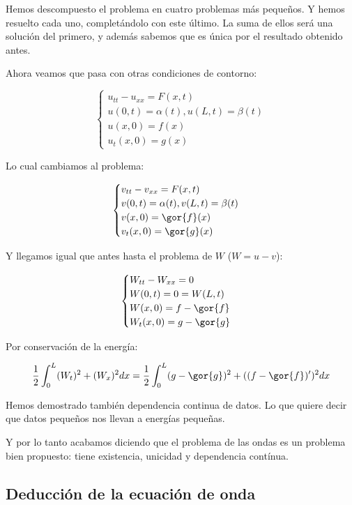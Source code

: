 			Hemos descompuesto el problema en cuatro problemas más pequeños. Y hemos resuelto cada uno, completándolo con este último. La suma de ellos será una solución del primero, y además sabemos que es única por el resultado obtenido antes.

			Ahora veamos que pasa con otras condiciones de contorno:

			\[ \begin{cases}
		 		u_{tt} - u_{xx} = F(x,t)\\
		 		u(0,t) = \alpha(t), u(L,t) = \beta(t) \\
		 		u(x,0) = f(x) \\
		 		u_t(x,0) = g(x)
		 	\end{cases}\]

		 	Lo cual cambiamos al problema:

		 	\[ \begin{cases}
		 		v_{tt} - v_{xx} = F(x,t)\\
		 		v(0,t) = \alpha(t), v(L,t) = \beta(t) \\
		 		v(x,0) = \gor{f}(x) \\
		 		v_t(x,0) = \gor{g}(x)
		 	\end{cases}\]

		 	Y llegamos igual que antes hasta el problema de $W$ ($W = u-v$):

		 	\[ \begin{cases}
		 		W_{tt} - W_{xx} = 0\\
		 		W(0,t) = 0 = W(L,t) \\
		 		W(x,0) = f - \gor{f} \\
		 		W_t(x,0) = g-  \gor{g}
		 	\end{cases}\]

		 	Por conservación de la energía:

		 	\[ \frac{1}{2} \int_0^L (W_t)^2 + (W_x)^2 dx = \frac{1}{2} \int_0^L (g-\gor{g})^2 + ((f-\gor{f})')^2 dx \]

		 	Hemos demostrado también dependencia continua de datos. Lo que quiere decir que datos pequeños nos llevan a energías pequeñas.

		 	Y por lo tanto acabamos diciendo que el problema de las ondas es un problema bien propuesto: tiene existencia, unicidad y dependencia contínua.



		\subsection{Deducción de la ecuación de onda}


